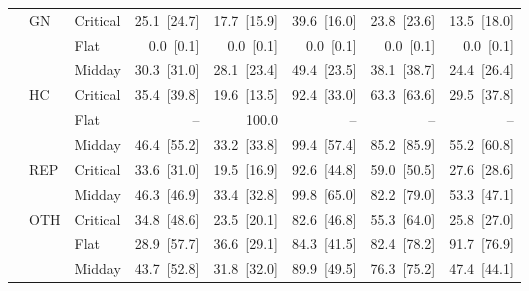 \begin{tabular}{l l l r r r r r}
 & GN & Critical & 25.1~{\color{seasoncol}\scriptsize[24.7]} & 17.7~{\color{seasoncol}\scriptsize[15.9]} & 39.6~{\color{seasoncol}\scriptsize[16.0]} & 23.8~{\color{seasoncol}\scriptsize[23.6]} & 13.5~{\color{seasoncol}\scriptsize[18.0]} \\
 &  & Flat & 0.0~{\color{seasoncol}\scriptsize[0.1]} & 0.0~{\color{seasoncol}\scriptsize[0.1]} & 0.0~{\color{seasoncol}\scriptsize[0.1]} & 0.0~{\color{seasoncol}\scriptsize[0.1]} & 0.0~{\color{seasoncol}\scriptsize[0.1]} \\
 &  & Midday & 30.3~{\color{seasoncol}\scriptsize[31.0]} & 28.1~{\color{seasoncol}\scriptsize[23.4]} & 49.4~{\color{seasoncol}\scriptsize[23.5]} & 38.1~{\color{seasoncol}\scriptsize[38.7]} & 24.4~{\color{seasoncol}\scriptsize[26.4]} \\
 & HC & Critical & 35.4~{\color{seasoncol}\scriptsize[39.8]} & 19.6~{\color{seasoncol}\scriptsize[13.5]} & 92.4~{\color{seasoncol}\scriptsize[33.0]} & 63.3~{\color{seasoncol}\scriptsize[63.6]} & 29.5~{\color{seasoncol}\scriptsize[37.8]} \\
 &  & Flat & -- & 100.0 & -- & -- & -- \\
 &  & Midday & 46.4~{\color{seasoncol}\scriptsize[55.2]} & 33.2~{\color{seasoncol}\scriptsize[33.8]} & 99.4~{\color{seasoncol}\scriptsize[57.4]} & 85.2~{\color{seasoncol}\scriptsize[85.9]} & 55.2~{\color{seasoncol}\scriptsize[60.8]} \\
 & REP & Critical & 33.6~{\color{seasoncol}\scriptsize[31.0]} & 19.5~{\color{seasoncol}\scriptsize[16.9]} & 92.6~{\color{seasoncol}\scriptsize[44.8]} & 59.0~{\color{seasoncol}\scriptsize[50.5]} & 27.6~{\color{seasoncol}\scriptsize[28.6]} \\
 &  & Midday & 46.3~{\color{seasoncol}\scriptsize[46.9]} & 33.4~{\color{seasoncol}\scriptsize[32.8]} & 99.8~{\color{seasoncol}\scriptsize[65.0]} & 82.2~{\color{seasoncol}\scriptsize[79.0]} & 53.3~{\color{seasoncol}\scriptsize[47.1]} \\
 & OTH & Critical & 34.8~{\color{seasoncol}\scriptsize[48.6]} & 23.5~{\color{seasoncol}\scriptsize[20.1]} & 82.6~{\color{seasoncol}\scriptsize[46.8]} & 55.3~{\color{seasoncol}\scriptsize[64.0]} & 25.8~{\color{seasoncol}\scriptsize[27.0]} \\
 &  & Flat & 28.9~{\color{seasoncol}\scriptsize[57.7]} & 36.6~{\color{seasoncol}\scriptsize[29.1]} & 84.3~{\color{seasoncol}\scriptsize[41.5]} & 82.4~{\color{seasoncol}\scriptsize[78.2]} & 91.7~{\color{seasoncol}\scriptsize[76.9]} \\
 &  & Midday & 43.7~{\color{seasoncol}\scriptsize[52.8]} & 31.8~{\color{seasoncol}\scriptsize[32.0]} & 89.9~{\color{seasoncol}\scriptsize[49.5]} & 76.3~{\color{seasoncol}\scriptsize[75.2]} & 47.4~{\color{seasoncol}\scriptsize[44.1]} \\

\end{tabular}
